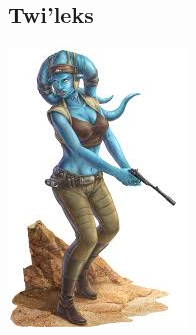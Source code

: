 \documentclass[twoside]{article}
\begin{document}
\subsection*{Twi'leks}

\noindent\begin{minipage}{0.3\textwidth}
	\includegraphics[width=1\linewidth]{../_img/species/twilek}
\end{minipage}%
\hfill%
\end{document}
